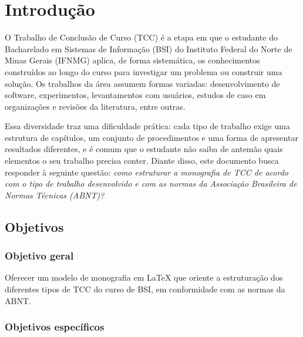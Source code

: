 \chapter{Introdução}
\label{cap1_introducao}


O Trabalho de Conclusão de Curso (TCC) é a etapa em que o estudante do Bacharelado em Sistemas de Informação (BSI) do Instituto Federal do Norte de Minas Gerais (IFNMG) aplica, de forma sistemática, os conhecimentos construídos ao longo do curso para investigar um problema ou construir uma solução. Os trabalhos da área assumem formas variadas: desenvolvimento de software, experimentos, levantamentos com usuários, estudos de caso em organizações e revisões da literatura, entre outras.

Essa diversidade traz uma dificuldade prática: cada tipo de trabalho exige uma estrutura de capítulos, um conjunto de procedimentos e uma forma de apresentar resultados diferentes, e é comum que o estudante não saiba de antemão quais elementos o seu trabalho precisa conter. Diante disso, este documento busca responder à seguinte questão: \textit{como estruturar a monografia de TCC de acordo com o tipo de trabalho desenvolvido e com as normas da Associação Brasileira de Normas Técnicas (ABNT)?}


\section{Objetivos}
\label{sec_objetivos}

\subsection{Objetivo geral}

Oferecer um modelo de monografia em \LaTeX{} que oriente a estruturação dos diferentes tipos de TCC do curso de BSI, em conformidade com as normas da ABNT.

\subsection{Objetivos específicos}

